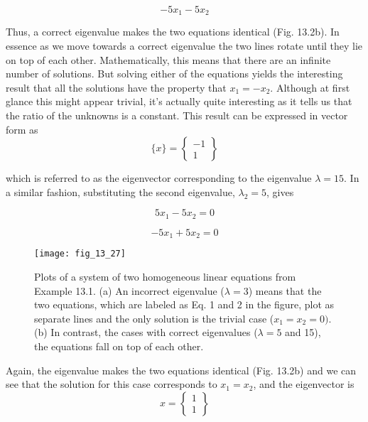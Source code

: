 \documentclass[../main.tex]{subfiles}
\begin{document}
\begin{equation}
-5x_{1}-5x_{2}
\end{equation}

Thus, a correct eigenvalue makes the two equations identical (Fig. 13.2b). In essence as we
move towards a correct eigenvalue the two lines rotate until they lie on top of each other.
Mathematically, this means that there are an infinite number of solutions. But solving
either of the equations yields the interesting result that all the solutions have the property
that $x_{1} = -x_{2}$. Although at first glance this might appear trivial, it's actually quite interesting
as it tells us that the ratio of the unknowns is a constant. This result can be expressed in vector form as
\begin{equation}
\{x\}=\begin{Bmatrix}
-1\\
1
\end{Bmatrix}
\end{equation}

which is referred to as the eigenvector corresponding to the eigenvalue $\lambda = 15$.
In a similar fashion, substituting the second eigenvalue, $\lambda_{2} = 5$, gives

\begin{equation}
5x_{1}-5x_{2}=0
\end{equation}

\begin{equation}
-5x_{1}+5x_{2}=0
\end{equation}

\begin{figure}[H]
		\centering
		\texttt{[image: fig\_13\_27]}
	   \caption{\textsf{Plots of a system of two homogeneous linear equations from Example 13.1. (a) An incorrect
eigenvalue ($\lambda = 3$) means that the two equations, which are labeled as Eq. 1 and 2 in the
figure, plot as separate lines and the only solution is the trivial case ($x_{1} = x_{2} = 0)$. (b) In contrast,
the cases with correct eigenvalues ($\lambda = 5$ and 15), the equations fall on top of each other.}}
	   \label{fig:fig_13_27}
\end{figure}

Again, the eigenvalue makes the two equations identical (Fig. 13.2b) and we can see that
the solution for this case corresponds to $x_{1} = x_{2}$, and the eigenvector is
\begin{equation}
{x}=\begin{Bmatrix}
1\\
1
\end{Bmatrix}
\end{equation}
\end{document}
